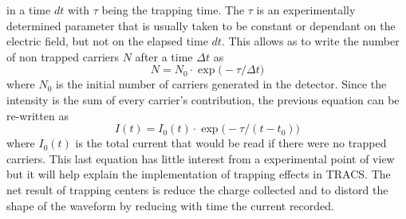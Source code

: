 in a time $dt$ with $\tau$ being the trapping time. The $\tau$ is an experimentally determined parameter that is usually taken to be constant or dependant on the electric field, but not on the elapsed time $dt$. This allows as to write the number of non trapped carriers $N$ after a time $\Delta t$ as
\[N = N_0 \cdot \exp{\big(- \tau/\Delta t} \big)\]
where $N_0$ is the initial number of carriers generated in the detector. Since the intensity is the sum of every carrier's contribution, the previous equation can be re-written as
\begin{equation}
	I(t) = I_0(t) \cdot \exp{\big(-\tau / (t-t_0)\big)}
 \label{eq:trapCurr}
\end{equation}
where $I_0(t)$ is the total current that would be read if there were no trapped carriers. This last equation has little interest from a experimental point of view but it will help explain the implementation of trapping effects in TRACS. The net result of trapping centers is reduce the charge collected and to distord the shape of the waveform by reducing with time the current recorded.

